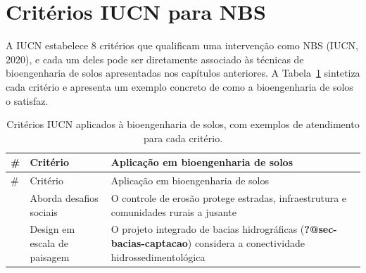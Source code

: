 \documentclass[
  portuguese,
  11pt,
  a4paper,
  open=any]{scrbook}
\begin{document}
\section{Critérios IUCN para NBS}\label{crituxe9rios-iucn-para-nbs}

A IUCN estabelece 8 critérios que qualificam uma intervenção como NBS
(IUCN, 2020), e cada um deles pode ser diretamente associado às técnicas
de bioengenharia de solos apresentadas nos capítulos anteriores. A
Tabela~\ref{tbl-criterios-iucn} sintetiza cada critério e apresenta um
exemplo concreto de como a bioengenharia de solos o satisfaz.

\begin{longtable}[]{@{}
  >{\raggedright\arraybackslash}p{}
  >{\raggedright\arraybackslash}p{}
  >{\raggedright\arraybackslash}p{}@{}}
\caption{Critérios IUCN aplicados à bioengenharia de solos, com exemplos
de atendimento para cada
critério.}\label{tbl-criterios-iucn}\tabularnewline
\toprule\noalign{}
\begin{minipage}[b]{\linewidth}\raggedright
\#
\end{minipage} & \begin{minipage}[b]{\linewidth}\raggedright
Critério
\end{minipage} & \begin{minipage}[b]{\linewidth}\raggedright
Aplicação em bioengenharia de solos
\end{minipage} \\
\midrule\noalign{}
\endfirsthead
\toprule\noalign{}
\begin{minipage}[b]{\linewidth}\raggedright
\#
\end{minipage} & \begin{minipage}[b]{\linewidth}\raggedright
Critério
\end{minipage} & \begin{minipage}[b]{\linewidth}\raggedright
Aplicação em bioengenharia de solos
\end{minipage} \\
\midrule\noalign{}
\endhead
\bottomrule\noalign{}
\endlastfoot
1 & Aborda desafios sociais & O controle de erosão protege estradas,
infraestrutura e comunidades rurais a jusante \\
2 & Design em escala de paisagem & O projeto integrado de bacias
hidrográficas (\textbf{?@sec-bacias-captacao}) considera a conectividade
hidrossedimentológica \\

\end{longtable}
\end{document}
